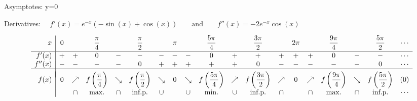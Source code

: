 \begin{Answer}
        \Question Asymptotes: \quad y=0\par
                  Derivatives: $\quad f'(x)= e^{-x}(- \sin (x) + \cos (x)) \qquad\mbox{and}\qquad f''(x) = -2 e^{-x} \cos (x)$
                   \begin{footnotesize} \[ %
                \begin{array}{r|cccccccccccccccccc}
                x &  0 & & \dfrac{\pi}{4} & & \dfrac{\pi}{2} &  & \pi & & \dfrac{5\pi}{4} & & \dfrac{3\pi}{2} & & 2\pi & & \dfrac{9\pi}{4} & & \dfrac{5\pi}{2}  & \cdots \\[0.2cm]
                \hline
                f'(x) &   + & + & 0 & -&- & -& - &- & 0 & +& + & + & + & + & 0 & -&- & \cdots     \\
                f''(x) & -& - & - & - & 0 &+ & + & +& + & +  & 0 &- & - & - & - & - & 0 & \cdots  \\
                \hline 
                &&&&\vspace{-0.3cm}\\
                f(x) &  0 & \nearrow & f\left(\dfrac{\pi}{4}\right)  & \searrow & f\left(\dfrac{\pi}{2}\right) & \searrow &  0 & \searrow & f\left(\dfrac{5\pi}{4}\right)  & \nearrow & f\left(\dfrac{3\pi}{2}\right) &  \nearrow & 0 &  \nearrow &f\left(\dfrac{9\pi}{4}\right)& \searrow & f\left(\dfrac{5\pi}{2}\right)  & (0)  \\
                
                & & \cap & \mbox{max.} & \cap & \mbox{inf.p.}  & \cup & & \cup & \mbox{min.}  & \cup & \mbox{inf.p.} & \cap & & \cap &   \mbox{max.}   & \cap &  \mbox{inf.p.} & \cdots
                \end{array} \] \end{footnotesize}
    

\end{Answer}
